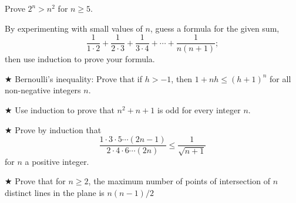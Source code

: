 \begin{proofp}
Prove $2^n>n^2$ for $n \ge 5$.
\end{proofp}

\begin{proofp}
By experimenting with small values of $n$, guess a formula for the given sum,
$$\frac{1}{1\cdot2}+\frac{1}{2\cdot3}+\frac{1}{3\cdot4}+\cdots+\frac{1}{n(n+1)};$$
then use induction to prove your formula.
\end{proofp}

\begin{proofp}$\bigstar$
 Bernoulli's inequality: Prove that if $h>-1$, then $1+nh \leq  (h+1)^n$ for all non-negative integers $n$. 
\end{proofp}

\begin{proofp}$\bigstar$
Use induction to prove that $n^2+n+1$ is odd for every integer $n$. 
\end{proofp}



\begin{proofp}$\bigstar$
Prove by induction that $$\frac{1 \cdot 3 \cdot 5 \cdots (2n-1)}{2\cdot 4 \cdot 6 \cdots (2n)} \leq \frac{1}{\sqrt{n+1}}$$ for $n$ a positive integer.
\end{proofp}


\begin{proofp}$\bigstar$
Prove that for $n \ge 2$, the maximum number of points of intersection of $n$ distinct lines in the plane is $n(n-1)/2$
\end{proofp}


